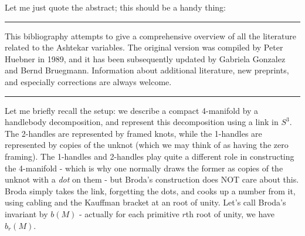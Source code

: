 \documentclass{article}
\def\tightlist{}
\renewcommand{\texttt}[1]{%
  \begingroup
  \ttfamily
  \begingroup\lccode`~=`/\lowercase{\endgroup\def~}{/\discretionary{}{}{}}%
  \begingroup\lccode`~=`[\lowercase{\endgroup\def~}{[\discretionary{}{}{}}%
  \begingroup\lccode`~=`.\lowercase{\endgroup\def~}{.\discretionary{}{}{}}%
  \catcode`/=\active\catcode`[=\active\catcode`.=\active
  \scantokens{#1\noexpand}%
  \endgroup
}
\begin{document}

Let me just quote the abstract; this should be a handy thing:

\begin{center}\rule{0.5\linewidth}{0.5pt}\end{center}

This bibliography attempts to give a comprehensive overview of all the
literature related to the Ashtekar variables. The original version was
compiled by Peter Huebner in 1989, and it has been subsequently updated
by Gabriela Gonzalez and Bernd Bruegmann. Information about additional
literature, new preprints, and especially corrections are always
welcome.

\begin{center}\rule{0.5\linewidth}{0.5pt}\end{center}


Let me briefly recall the setup: we describe a compact 4-manifold by a
handlebody decomposition, and represent this decomposition using a link
in \(S^3\). The 2-handles are represented by framed knots, while the
1-handles are represented by copies of the unknot (which we may think of
as having the zero framing). The 1-handles and 2-handles play quite a
different role in constructing the 4-manifold - which is why one
normally draws the former as copies of the unknot with a \emph{dot} on
them - but Broda's construction does NOT care about this. Broda simply
takes the link, forgetting the dots, and cooks up a number from it,
using cabling and the Kauffman bracket at an root of unity. Let's call
Broda's invariant by \(b(M)\) - actually for each primitive \(r\)th root
of unity, we have \(b_r(M)\).
\end{document}

